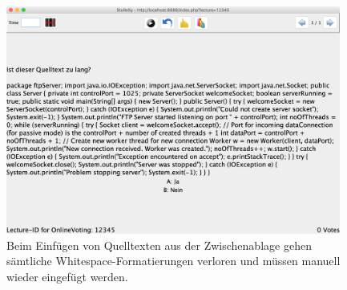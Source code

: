 \begin{figure}[H]
    \includegraphics[width=11cm]{chapter/bewertung/bilder/StuReSy_Problem_3.png}
    \centering
    \caption{Beim Einfügen von Quelltexten aus der Zwischenablage gehen sämtliche Whitespace-Formatierungen verloren und müssen manuell wieder eingefügt werden.}
    \label{abb:sturesy_problem_3}
\end{figure}

